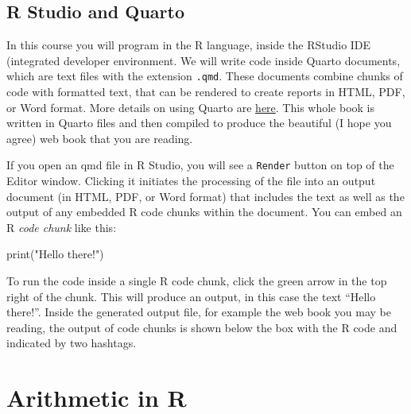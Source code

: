 \documentclass[
  letterpaper,
  DIV=11,
  numbers=noendperiod]{scrreprt}
\newenvironment{Shaded}{\begin{snugshade}}{\end{snugshade}}
\newcommand{\NormalTok}[1]{\textcolor[rgb]{0.00,0.23,0.31}{#1}}
\begin{document}
\hypertarget{r-studio-and-quarto}{%
\subsection*{R Studio and Quarto}\label{r-studio-and-quarto}}

In this course you will program in the R language, inside the RStudio
IDE (integrated developer environment. We will write code inside Quarto
documents, which are text files with the extension \texttt{.qmd}. These
documents combine chunks of code with formatted text, that can be
rendered to create reports in HTML, PDF, or Word format. More details on
using Quarto are
\href{https://quarto.org/docs/computations/r.html}{here}. This whole
book is written in Quarto files and then compiled to produce the
beautiful (I hope you agree) web book that you are reading.

If you open an qmd file in R Studio, you will see a \texttt{Render}
button on top of the Editor window. Clicking it initiates the processing
of the file into an output document (in HTML, PDF, or Word format) that
includes the text as well as the output of any embedded R code chunks
within the document. You can embed an R \emph{code chunk} like this:

\begin{Shaded}
\begin{Highlighting}[]
\NormalTok{print("Hello there!") }
\end{Highlighting}
\end{Shaded}

To run the code inside a single R code chunk, click the green arrow in
the top right of the chunk. This will produce an output, in this case
the text ``Hello there!''. Inside the generated output file, for example
the web book you may be reading, the output of code chunks is shown
below the box with the R code and indicated by two hashtags.

\hypertarget{arithmetic-in-r}{%
\section*{Arithmetic in R}\label{arithmetic-in-r}}

\end{document}

